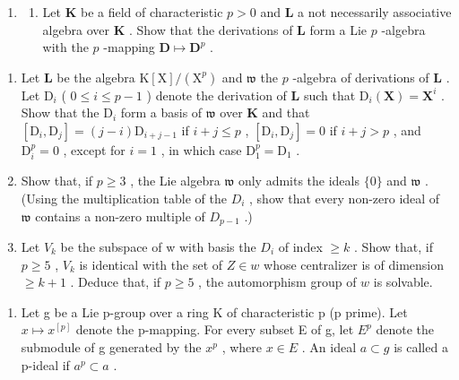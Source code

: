 \begin{enumerate}
\def\labelenumi{\arabic{enumi}.}
\setcounter{enumi}{20}
\tightlist
\item
  \begin{enumerate}
  \def\labelenumii{(\alph{enumii})}
  \tightlist
  \item
    Let \(\mathbf{K}\) be a field of characteristic \(p > 0\) and \(\mathbf{L}\) a not necessarily associative algebra over \(\mathbf{K}\) . Show that the derivations of \(\mathbf{L}\) form a Lie \(p\) -algebra with the \(p\) -mapping \(\mathbf{D} \mapsto \mathbf{D}^p\) .
  \end{enumerate}
\end{enumerate}

\begin{enumerate}
\def\labelenumi{(\alph{enumi})}
\setcounter{enumi}{1}
\item
  Let \(\mathbf{L}\) be the algebra \(\mathrm{K}[\mathrm{X}] / (\mathrm{X}^p)\) and \(\mathfrak{w}\) the \(p\) -algebra of derivations of \(\mathbf{L}\) . Let \(\mathrm{D}_i\) ( \(0 \leqslant i \leqslant p - 1\) ) denote the derivation of \(\mathbf{L}\) such that \(\mathrm{D}_i(\mathbf{X}) = \mathbf{X}^i\) . Show that the \(\mathrm{D}_i\) form a basis of \(\mathfrak{w}\) over \(\mathbf{K}\) and that \([\mathrm{D}_i, \mathrm{D}_j] = (j - i)\mathrm{D}_{i + j - 1}\) if \(i + j \leqslant p\) , \([\mathrm{D}_i, \mathrm{D}_j] = 0\) if \(i + j > p\) , and \(\mathrm{D}_i^p = 0\) , except for \(i = 1\) , in which case \(\mathrm{D}_1^p = \mathrm{D}_1\) .
\item
  Show that, if \(p \geqslant 3\) , the Lie algebra \(\mathfrak{w}\) only admits the ideals \(\{0\}\) and \(\mathfrak{w}\) . (Using the multiplication table of the \(D_i\) , show that every non-zero ideal of \(\mathfrak{w}\) contains a non-zero multiple of \(D_{p-1}\) .)
\item
  Let \(V_{k}\) be the subspace of w with basis the \(D_{i}\) of index \(\geqslant k\) . Show that, if \(p \geqslant 5\) , \(V_k\) is identical with the set of \(Z \in w\) whose centralizer is of dimension \(\geqslant k + 1\) . Deduce that, if \(p \geqslant 5\) , the automorphism group of \(w\) is solvable.
\end{enumerate}

\begin{enumerate}
\def\labelenumi{\arabic{enumi}.}
\setcounter{enumi}{21}
\tightlist
\item
  Let g be a Lie p-group over a ring K of characteristic p (p prime). Let \(x \mapsto x^{[p]}\) denote the p-mapping. For every subset E of g, let \(E^{p}\) denote the submodule of g generated by the \(x^{p}\) , where \(x \in E\) . An ideal \(a \subset g\) is called a p-ideal if \(a^{p} \subset a\) .
\end{enumerate}

